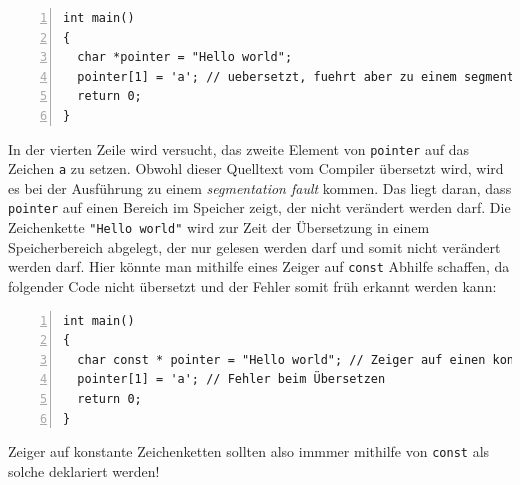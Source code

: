 \begin{minipage}{\linewidth}
\begin{lstlisting}[numbers=left]
int main()
{
  char *pointer = "Hello world";
  pointer[1] = 'a'; // uebersetzt, fuehrt aber zu einem segmentation fault
  return 0;
}
\end{lstlisting}
\end{minipage}

In der vierten Zeile wird versucht, das zweite Element von \verb|pointer| auf das Zeichen \verb|a| zu setzen.
Obwohl dieser Quelltext vom Compiler übersetzt wird, wird es bei der Ausführung zu einem \emph{segmentation fault} kommen.
Das liegt daran, dass \verb|pointer| auf einen Bereich im Speicher zeigt, der nicht verändert werden darf.
Die Zeichenkette \verb|"Hello world"| wird zur Zeit der Übersetzung in einem Speicherbereich abgelegt, der nur gelesen werden darf und somit nicht verändert werden darf.
Hier könnte man mithilfe eines Zeiger auf \verb|const| Abhilfe schaffen, da folgender Code nicht übersetzt und der Fehler somit früh erkannt werden kann:

\begin{minipage}{\linewidth}
\begin{lstlisting}[numbers=left]
int main()
{
  char const * pointer = "Hello world"; // Zeiger auf einen konstanten Speicherbereich
  pointer[1] = 'a'; // Fehler beim Übersetzen
  return 0;
}
\end{lstlisting}
\end{minipage}

Zeiger auf konstante Zeichenketten sollten also immmer mithilfe von \texttt{const} als solche deklariert werden!


\endinput
